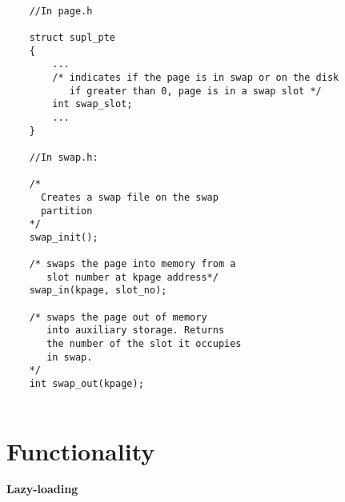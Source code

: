 \begin{lstlisting}
	
	//In page.h
	
	struct supl_pte
	{
		...
		/* indicates if the page is in swap or on the disk
		   if greater than 0, page is in a swap slot */
		int	swap_slot;
		...
	}
	
	//In swap.h:
	
	/*
	  Creates a swap file on the swap
	  partition
	*/
	swap_init();
	
	/* swaps the page into memory from a
	   slot number at kpage address*/
	swap_in(kpage, slot_no);
	
	/* swaps the page out of memory
	   into auxiliary storage. Returns
	   the number of the slot it occupies
	   in swap.
	*/
	int swap_out(kpage);
	
\end{lstlisting}

\section{Functionality}

\textbf{Lazy-loading}

